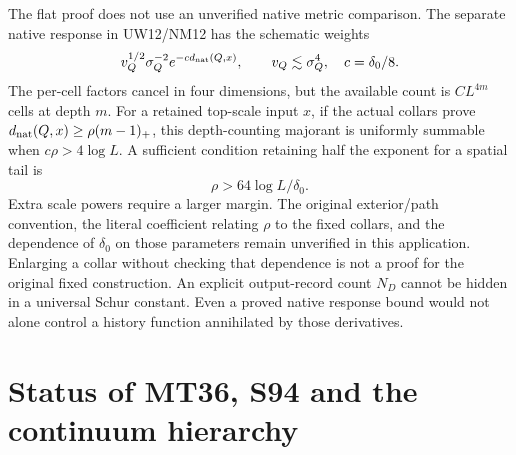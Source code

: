 \documentclass[11pt,letterpaper]{article}
\theoremstyle{remark}\newtheorem{remark}[theorem]{Remark}
\begin{document}
The flat proof does not use an unverified native metric comparison. The separate native response in UW12/NM12 has the schematic weights
\[
 v_Q^{1/2}\sigma_Q^{-2}e^{-c d_{\rm nat}(Q,x)},
 \qquad v_Q\lesssim\sigma_Q^4,\quad c=\delta_0/8.
\]
The per-cell factors cancel in four dimensions, but the available count is \(CL^{4m}\) cells at depth \(m\). For a retained top-scale input \(x\), if the actual collars prove
\(d_{\rm nat}(Q,x)\ge\rho(m-1)_+\), this depth-counting majorant is uniformly summable when \(c\rho>4\log L\). A sufficient condition retaining half the exponent for a spatial tail is
\begin{equation}\label{eq:collar}
 \rho>64\log L/\delta_0.
\end{equation}
Extra scale powers require a larger margin. The original exterior/path convention, the literal coefficient relating \(\rho\) to the fixed collars, and the dependence of \(\delta_0\) on those parameters remain unverified in this application. Enlarging a collar without checking that dependence is not a proof for the original fixed construction. An explicit output-record count \(N_D\) cannot be hidden in a universal Schur constant. Even a proved native response bound would not alone control a history function annihilated by those derivatives.

\section{Status of MT36, S94 and the continuum hierarchy}
\end{document}
